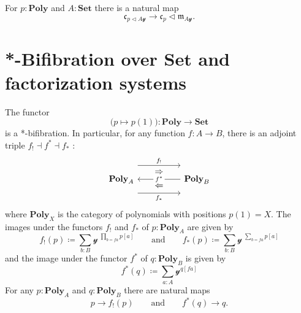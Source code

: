 \documentclass[11pt, one side, article]{memoir}
\theoremstyle{definition}
\theoremstyle{plain}
\newcommand{\Cat}[1]{\mathbf{#1}}%
\newcommand{\smset}{\Cat{Set}}
\newcommand{\yon}{\mathcal{y}}
\newcommand{\poly}{\Cat{Poly}}
\newcommand{\0}{\textsf{0}}
\newcommand{\1}{\tn{\textsf{1}}}
\newcommand{\tri}{\mathbin{\triangleleft}}
\newcommand{\cofree}{\mathfrak{c}}
\newcommand{\free}{\mathfrak{m}}
\newcommand{\qqand}{\qquad\text{and}\qquad}
\begin{document}
For $p:\poly$ and $A:\smset$ there is a natural map
\begin{equation}
	\cofree_{p\tri A\yon}\to\cofree_p\tri\free_{A\yon}.
\end{equation}



\chapter{*-Bifibration over $\smset$ and factorization systems}\label{chap.bifib}

The functor
\begin{equation}\label{eqn.bifib}
\big(p\mapsto p(1)\big)\colon\poly\to\smset
\end{equation}
is a *-bifibration. In particular, for any function $f\colon A\to B$, there is an adjoint triple $f_!\dashv f^*\dashv f_*$ :
\begin{equation}
\begin{tikzcd}[column sep=50pt]
	\poly_A
		\ar[r, shift left=16pt, "f_!"]
		\ar[r, shift right=16pt, "f_*"']
		\ar[from=r, "f^*" description]
		\ar[r, phantom, shift left=8pt, "\Rightarrow"]
		\ar[r, phantom, shift right=8pt, "\Leftarrow"]
	&
	\poly_B
\end{tikzcd}
\end{equation}
where $\poly_X$ is the category of polynomials with positions $p(1)=X$. The images under the functors $f_!$ and $f_*$ of $p:\poly_A$ are given by
\begin{equation}
	f_!(p)\coloneqq\sum_{b: B}\yon^{\;\prod\limits_{b=fa}p[a]}
	\qqand
	f_*(p)\coloneqq\sum_{b: B}\yon^{\;\sum\limits_{b=fa}p[a]}
\end{equation}
and the image under the functor $f^*$ of $q:\poly_B$ is given by
\begin{equation}
	f^*(q)\coloneqq\sum_{a: A}\yon^{q[fa]}
\end{equation}
For any $p:\poly_A$ and $q:\poly_B$ there are natural maps
\begin{equation}
	p\to f_!(p)
	\qqand
	f^*(q)\to q.
\end{equation}
\end{document}

